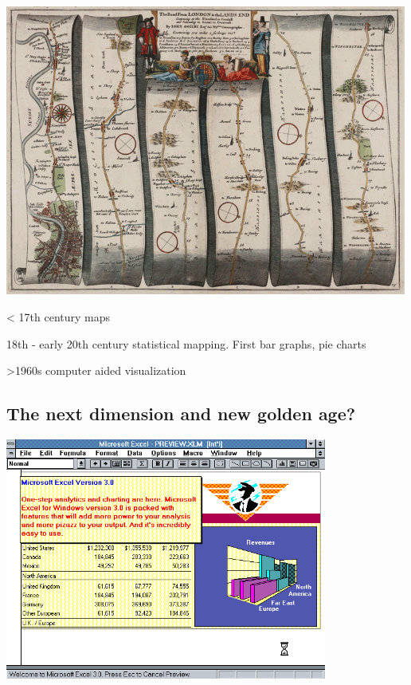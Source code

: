 \documentclass[
  letterpaper,
  DIV=11,
  numbers=noendperiod]{scrartcl}
\begin{document}
\includegraphics[width=5.20833in,height=\textheight]{images/1675-Ogilby-The_Road_From_LONDON_to_the_LANDS_END.png}

\textless{} 17th century maps

18th - early 20th century statistical mapping. First bar graphs, pie
charts

\textgreater1960s computer aided visualization

\hypertarget{the-next-dimension-and-new-golden-age}{%
\subsection{The next dimension and new golden
age?}\label{the-next-dimension-and-new-golden-age}}

\includegraphics[width=\textwidth,height=3.125in]{images/excel-for-windows-3.0-charts-and-graphs.png}
\end{document}
